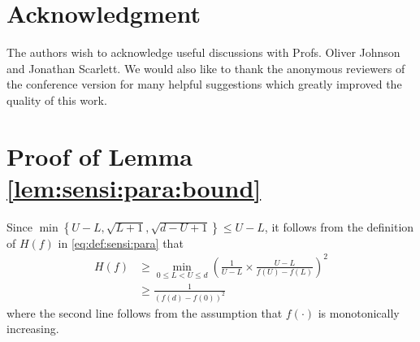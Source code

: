 \documentclass[onecolumn,letterpaper]{IEEEtran}
\newcommand{\up}{{U}}
\newcommand{\lw}{{L}}
\newcommand{\fH}{{H(f)}}
\newcommand{\xw}[1]{\textcolor{cyan}{#1}}
\begin{document}
%





 \section*{Acknowledgment}
The authors wish to acknowledge useful discussions with Profs. Oliver Johnson and Jonathan Scarlett. We would also like to thank the anonymous reviewers of the conference version for many helpful suggestions which greatly improved the quality of this work.


\newpage
\appendices
\makeatletter
\renewcommand{\thesubsection}{\thesectiondis-\arabic{subsection}}
\renewcommand{\thesubsectiondis}{\arabic{subsection}.}

\makeatother

\label{appendix}

\section{Proof of Lemma \ref{lem:sensi:para:bound}}
\label{app:sensi:para:bound}

Since $ \min\left\{\up-\lw , \sqrt{\lw+1} , \sqrt{d-\up+1}\right\} \leq \up-\lw $,
it follows from the definition of $\fH$ in \eqref{eq:def:sensi:para} that   
\begin{align*}
     \fH &\geq \min_{0\leq \lw<\up \leq d}\left(\frac{1}{\up-\lw}\times \frac{\up-\lw}{f(\up)-f(\lw)} \right)^2 \\
         &\geq \frac{1}{\left(f(d)-f(0)\right)^2}
\end{align*} 
where the second line follows from the assumption that $f(\cdot)$ is monotonically increasing. 
\end{document}

